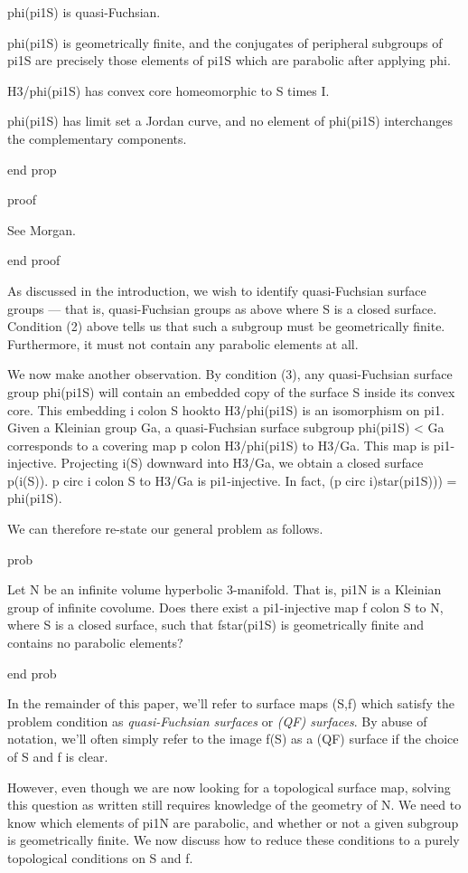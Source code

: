 phi(pi1S) is quasi-Fuchsian.

phi(pi1S) is geometrically finite, and the conjugates of peripheral subgroups
of pi1S are precisely those elements of pi1S which are parabolic after applying
phi.

H3/phi(pi1S) has convex core homeomorphic to S times I.

phi(pi1S) has limit set a Jordan curve, and no element of phi(pi1S)
interchanges the complementary components.

end prop

proof

See Morgan.%

end proof

As discussed in the introduction, we wish to identify quasi-Fuchsian surface
groups --- that is, quasi-Fuchsian groups as above where S is a closed surface.
Condition (2) above tells us that such a subgroup must be geometrically finite.
Furthermore, it must not contain any parabolic elements at all.

We now make another observation. By condition (3), any quasi-Fuchsian surface
group phi(pi1S) will contain an embedded copy of the surface S inside its
convex core.  This embedding i colon S hookto H3/phi(pi1S) is an isomorphism on
pi1.  Given a Kleinian group Ga, a quasi-Fuchsian surface subgroup phi(pi1S)
< Ga corresponds to a covering map p colon H3/phi(pi1S) to H3/Ga. This map is
pi1-injective.  Projecting i(S) downward into H3/Ga, we obtain a closed surface
p(i(S)). p circ i colon S to H3/Ga is pi1-injective. In fact, (p circ
i)star(pi1S))) = phi(pi1S).

We can therefore re-state our general problem as follows.

prob

Let N be an infinite volume hyperbolic 3-manifold. That is, pi1N is a Kleinian
group of infinite covolume. Does there exist a pi1-injective map f colon S to
N, where S is a closed surface, such that fstar(pi1S) is geometrically finite
and contains no parabolic elements?

end prob

In the remainder of this paper, we'll refer to surface maps (S,f) which satisfy
the problem condition as \emph{quasi-Fuchsian surfaces} or \emph{(QF)
surfaces}. By abuse of notation, we'll often simply refer to the image f(S) as
a (QF) surface if the choice of S and f is clear.

However, even though we are now looking for a topological surface map, solving
this question as written still requires knowledge of the geometry of N. We need
to know which elements of pi1N are parabolic, and whether or not a given
subgroup is geometrically finite. We now discuss how to reduce these conditions
to a purely topological conditions on S and f.

